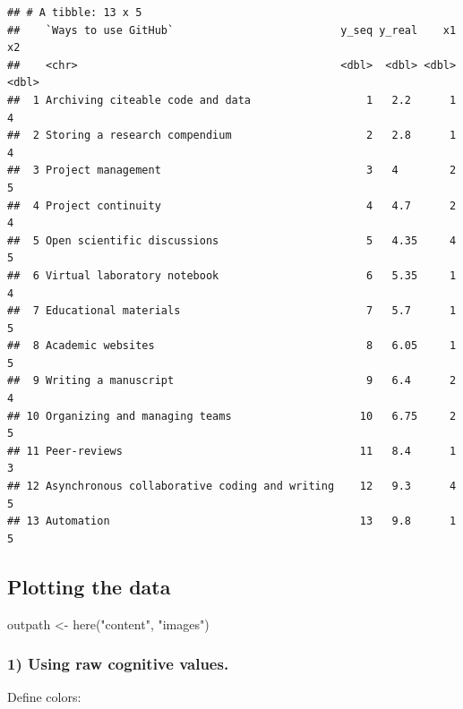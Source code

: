 \documentclass[
  11pt,
]{article}
\newenvironment{Shaded}{\begin{snugshade}}{\end{snugshade}}
\newcommand{\FunctionTok}[1]{\textcolor[rgb]{0.00,0.00,0.00}{#1}}
\newcommand{\NormalTok}[1]{#1}
\newcommand{\OtherTok}[1]{\textcolor[rgb]{0.56,0.35,0.01}{#1}}
\newcommand{\StringTok}[1]{\textcolor[rgb]{0.31,0.60,0.02}{#1}}
\begin{document}
\begin{verbatim}
## # A tibble: 13 x 5
##    `Ways to use GitHub`                          y_seq y_real    x1    x2
##    <chr>                                         <dbl>  <dbl> <dbl> <dbl>
##  1 Archiving citeable code and data                  1   2.2      1     4
##  2 Storing a research compendium                     2   2.8      1     4
##  3 Project management                                3   4        2     5
##  4 Project continuity                                4   4.7      2     4
##  5 Open scientific discussions                       5   4.35     4     5
##  6 Virtual laboratory notebook                       6   5.35     1     4
##  7 Educational materials                             7   5.7      1     5
##  8 Academic websites                                 8   6.05     1     5
##  9 Writing a manuscript                              9   6.4      2     4
## 10 Organizing and managing teams                    10   6.75     2     5
## 11 Peer-reviews                                     11   8.4      1     3
## 12 Asynchronous collaborative coding and writing    12   9.3      4     5
## 13 Automation                                       13   9.8      1     5
\end{verbatim}

\hypertarget{plotting-the-data}{%
\subsection{Plotting the data}\label{plotting-the-data}}

\begin{Shaded}
\begin{Highlighting}[]
\NormalTok{outpath }\OtherTok{\textless{}{-}} \FunctionTok{here}\NormalTok{(}\StringTok{"content"}\NormalTok{, }\StringTok{"images"}\NormalTok{)}
\end{Highlighting}
\end{Shaded}

\hypertarget{using-raw-cognitive-values.}{%
\subsubsection{1) Using raw cognitive values.}\label{using-raw-cognitive-values.}}

Define colors:
\end{document}
